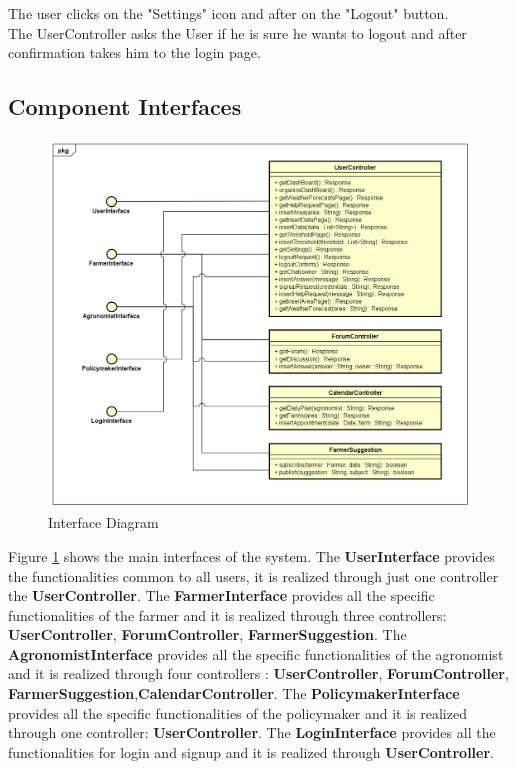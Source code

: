 The user clicks on the "Settings" icon and after on the "Logout" button. \\
The UserController asks the User if he is sure he wants to logout and after confirmation takes him to the login page.


\newpage

\subsection{Component Interfaces}
\begin{figure}[H]
    \includegraphics[width=\textwidth,height=\textheight,keepaspectratio]{Images/InterfaceDiagram.png}
    \caption{Interface Diagram}
    \label{fig:interface_diagram}
\end{figure}
Figure \ref{fig:interface_diagram} shows the main interfaces of the system.\newline
The \textbf{UserInterface} provides the functionalities common to all users, it is realized through just one controller the \textbf{UserController}. \newline
The \textbf{FarmerInterface} provides all the specific functionalities of the farmer and it is realized through three controllers: \textbf{UserController}, \textbf{ForumController}, \textbf{FarmerSuggestion}.\newline
The \textbf{AgronomistInterface} provides all the specific functionalities of the agronomist and it is realized through four controllers     :
\textbf{UserController}, \textbf{ForumController}, \textbf{FarmerSuggestion},\textbf{CalendarController}.\newline
The \textbf{PolicymakerInterface} provides all the specific functionalities of the policymaker and it is realized through one controller:
\textbf{UserController}.\newline
The \textbf{LoginInterface} provides all the functionalities for login and signup and it is realized through \textbf{UserController}.


